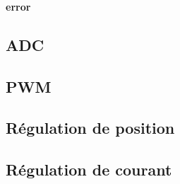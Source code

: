 \subsubsection{}

\subsubsection{}

\subsubsection{}

\textbf{error}

\textbf{}

\subsection{ADC}

\subsection{PWM}

\subsection{Régulation de position}

\subsection{Régulation de courant}